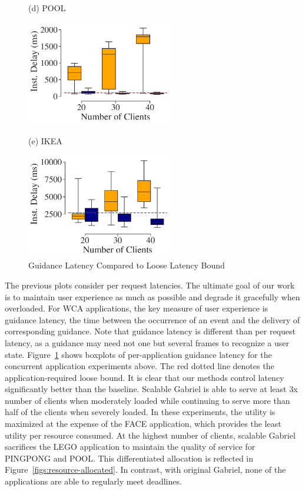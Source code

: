 \begin{figure}[]
\begin{turn}{90}{\hspace{0.6in}\small (d)
POOL}\end{turn}\hspace{0.2in}\includegraphics[width=2.5in, trim=0em 0em 0em 0em,
clip]{FIGS/fig-sec6-latency-pool.pdf}\\[0.08in]
  \vspace{0in}
\begin{turn}{90}{\hspace{0.6in}\small (e) IKEA}\end{turn}\hspace{0.2in}\includegraphics[width=2.5in, trim=0em 0em 0em 0em, clip]{FIGS/fig-sec6-latency-ikea.pdf}
\caption{Guidance Latency Compared to Loose Latency Bound}
\label{figs:inst-delay}
\end{figure}
		
The previous plots consider per request latencies. The ultimate goal of our work
is to maintain user experience as much as possible and degrade it gracefully
when overloaded. For WCA applications, the key measure of user experience is
guidance latency, the time between the occurrence of an event and the delivery
of corresponding guidance. Note that guidance latency is different than per
request latency, as a guidance may need not one but several frames to recognize
a user state. Figure~\ref{figs:inst-delay} shows boxplots of per-application
guidance latency for the concurrent application experiments above. The red
dotted line denotes the application-required loose bound. It is clear that our
methods control latency significantly better than the baseline. Scalable Gabriel
is able to serve at least 3x number of clients when moderately loaded while
continuing to serve more than half of the clients when severely loaded. In these
experiments, the utility is maximized at the expense of the FACE application,
which provides the least utility per resource consumed. At the highest number of
clients, scalable Gabriel sacrifices the LEGO application to maintain the
quality of service for PINGPONG and POOL. This differentiated allocation is
reflected in Figure~\ref{figs:resource-allocated}. In contrast, with original
Gabriel, none of the applications are able to regularly meet deadlines.

\clearpage